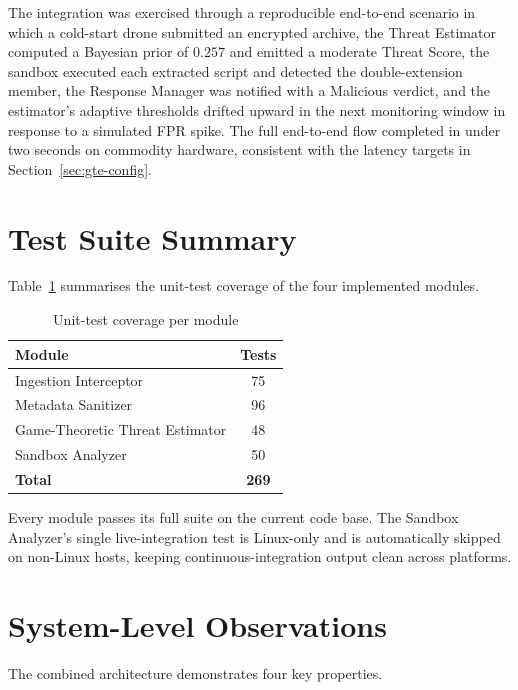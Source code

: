 \documentclass[12pt, a4paper]{report}
\begin{document}
The integration was exercised through a reproducible end-to-end
scenario in which a cold-start drone submitted an encrypted archive,
the Threat Estimator computed a Bayesian prior of $0.257$ and emitted
a moderate Threat Score, the sandbox executed each extracted script
and detected the double-extension member, the Response Manager was
notified with a Malicious verdict, and the estimator's adaptive
thresholds drifted upward in the next monitoring window in response
to a simulated FPR spike. The full end-to-end flow completed in under
two seconds on commodity hardware, consistent with the latency
targets in Section~\ref{sec:gte-config}.

\section{Test Suite Summary}

Table~\ref{tab:tests} summarises the unit-test coverage of the four
implemented modules.

\begin{table}[H]
\centering
\caption{Unit-test coverage per module}
\label{tab:tests}
\begin{tabular}{|l|c|}
\hline
\textbf{Module} & \textbf{Tests} \\
\hline
Ingestion Interceptor & 75 \\
\hline
Metadata Sanitizer & 96 \\
\hline
Game-Theoretic Threat Estimator & 48 \\
\hline
Sandbox Analyzer & 50 \\
\hline
\textbf{Total} & \textbf{269} \\
\hline
\end{tabular}
\end{table}

Every module passes its full suite on the current code base. The
Sandbox Analyzer's single live-integration test is Linux-only and is
automatically skipped on non-Linux hosts, keeping continuous-integration
output clean across platforms.

\section{System-Level Observations}

The combined architecture demonstrates four key properties.
\end{document}
